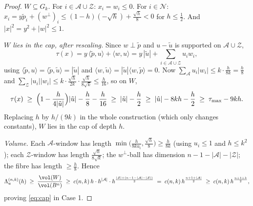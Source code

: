 \begin{proof}
\emph{$W\subseteq G_k$.}  For $i\in\mathcal A\cup\mathcal Z$:
$x_i=w_i\le0$.  For $i\in\mathcal N$:
$x_i=y\tilde p_i+(w^\perp)_i\le(1-h)(-\sqrt h)+\frac{\sqrt h}8<0$ for
$h\le\frac12$.  And $|x|^2=y^2+|w|^2\le1$.

\emph{$W$ lies in the cap, after rescaling.}  Since $w\perp\tilde p$ and
$u-\tilde u$ is supported on $\mathcal A\cup\mathcal Z$,
\[
\tau(x)=y\,\langle\tilde p,u\rangle+\langle w,u\rangle
=y\,|\tilde u|+\sum_{i\in\mathcal A\cup\mathcal Z}u_iw_i ,
\]
using $\langle\tilde p,u\rangle=\langle\tilde p,\tilde u\rangle=|\tilde u|$
and $\langle w,\tilde u\rangle=|\tilde u|\langle w,\tilde p\rangle=0$.  Now
$\sum_{\mathcal A}u_i|w_i|\le k\cdot\frac h{8k}=\frac h8$ and
$\sum_{\mathcal Z}|u_i||w_i|\le k\cdot\frac{\sqrt h}{2k}\cdot
\frac{\sqrt h}{8\sqrt k}\le\frac h{16}$, so on $W$,
\[
\tau(x)\;\ge\;\Bigl(1-\frac h{4|\tilde u|}\Bigr)|\tilde u|
-\frac h8-\frac h{16}
\;\ge\;|\tilde u|-\frac h2
\;\ge\;|\hat u|-8kh-\frac h2
\;\ge\;\tau_{\max}-9kh .
\]
Replacing $h$ by $h/(9k)$ in the whole construction (which only changes
constants), $W$ lies in the cap of depth $h$.

\emph{Volume.}  Each $\mathcal A$-window has length
$\min\bigl(\frac h{8ku_i},\frac{\sqrt h}8\bigr)\ge\frac h{8k}$ (using
$u_i\le1$ and $h\le k^2$); each $\mathcal Z$-window has length
$\frac{\sqrt h}{8\sqrt k}$; the $w^\perp$-ball has dimension
$n-1-|\mathcal A|-|\mathcal Z|$; the fibre has length $\ge\frac h8$.  Hence
\[
\Lambda^{(n,k)}_u(h)\;\ge\;\frac{\vol(W)}{\vol(B^n)}
\;\ge\;c(n,k)\,h\cdot h^{|\mathcal A|}\cdot
h^{\frac{|\mathcal Z|+(n-1-|\mathcal A|-|\mathcal Z|)}2}
\;=\;c(n,k)\,h^{\frac{n+1+|\mathcal A|}2}
\;\ge\;c(n,k)\,h^{\frac{n+1+k}2},
\]
proving \eqref{eq:cap} in Case 1.


\end{proof}

